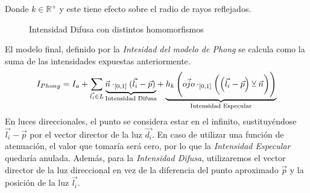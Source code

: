 Donde \(k\in\mathbb{R}^{+}\) y este tiene efecto sobre el radio de rayos reflejados.
\begin{figure}[H]
  \centering
  \captionsetup{justification=centering}%
  \hfill
  \hfill
  \caption{Intensidad Difusa con distintos homomorfismos}
\end{figure}
El modelo final, definido por la \textit{Intesidad del modelo de Phong} se calcula como la suma de las intensidades expuestas anteriormente.
\[I_{Phong}=I_a+\sum_{\Vec{l_i}\in L} \mathrlap{\underbrace{\phantom{\Vec{n}\cdot_{[0, 1]}(\Vec{l_i}-\Vec{p})}}_{\text{Intensidad Difusa}}}\Vec{n}\cdot_{[0, 1]}(\Vec{l_i}-\Vec{p}) + \mathrlap{\underbrace{\phantom{h_k\left(\Vec{ojo}\cdot_{[0, 1]}\left(\left(\Vec{l_i}-\Vec{p}\right) \veebar \Vec{n}\right)\right)}}_{\text{Intensidad Especular}}}h_k\left(\Vec{ojo}\cdot_{[0, 1]}\left(\left(\Vec{l_i}-\Vec{p}\right) \veebar \Vec{n}\right)\right)\]
En luces direccionales, el punto se considera estar en el infinito, sustituyéndose \(\Vec{l_i}-\Vec{p}\) por el vector director de la luz \(\Vec{d_i}\). En caso de utilizar una función de atenuación, el valor que tomaría  será cero, por lo que la \textit{Intensidad Especular} quedaría anulada. Además, para la \textit{Intensidad Difusa}, utilizaremos el vector director de la luz direccional en vez de la diferencia del punto aproximado \(\Vec{p}\) y la posición de la luz \(\Vec{l_i}\).\\\\
